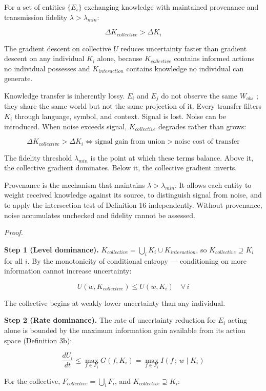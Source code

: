 \documentclass[
]{article}
\begin{document}
For a set of entities \(\{E_i\}\) exchanging knowledge with maintained
provenance and transmission fidelity \(\lambda > \lambda_{min}\):

\[\Delta K_{collective} > \Delta K_i\]

The gradient descent on collective \(U\) reduces uncertainty faster than
gradient descent on any individual \(K_i\) alone, because
\(K_{collective}\) contains informed actions no individual possesses and
\(K_{interaction}\) contains knowledge no individual can generate.

Knowledge transfer is inherently lossy. \(E_i\) and \(E_j\) do not
observe the same \(W_{obs}\) ; they share the same world but not the
same projection of it. Every transfer filters \(K_i\) through language,
symbol, and context. Signal is lost. Noise can be introduced. When noise
exceeds signal, \(K_{collective}\) degrades rather than grows:

\[\Delta K_{collective} > \Delta K_i \iff \text{signal gain from union} > \text{noise cost of transfer}\]

The fidelity threshold \(\lambda_{min}\) is the point at which these
terms balance. Above it, the collective gradient dominates. Below it,
the collective gradient inverts.

Provenance is the mechanism that maintains \(\lambda > \lambda_{min}\).
It allows each entity to weight received knowledge against its source,
to distinguish signal from noise, and to apply the intersection test of
Definition 16 independently. Without provenance, noise accumulates
unchecked and fidelity cannot be assessed.

\emph{Proof.}

\textbf{Step 1 (Level dominance).}
\(K_{collective} = \bigcup_i K_i \cup K_{interaction}\), so
\(K_{collective} \supseteq K_i\) for all \(i\). By the monotonicity of
conditional entropy --- conditioning on more information cannot increase
uncertainty:

\[U(w, K_{collective}) \leq U(w, K_i) \quad \forall\, i\]

The collective begins at weakly lower uncertainty than any individual.

\textbf{Step 2 (Rate dominance).} The rate of uncertainty reduction for
\(E_i\) acting alone is bounded by the maximum information gain
available from its action space (Definition 3b):

\[\frac{dU_i}{dt} \leq \max_{f \in F_i} G(f, K_i) = \max_{f \in F_i} I(f\,;\, w \mid K_i)\]

For the collective, \(F_{collective} = \bigcup_i F_i\), and
\(K_{collective} \supseteq K_i\):
\end{document}
